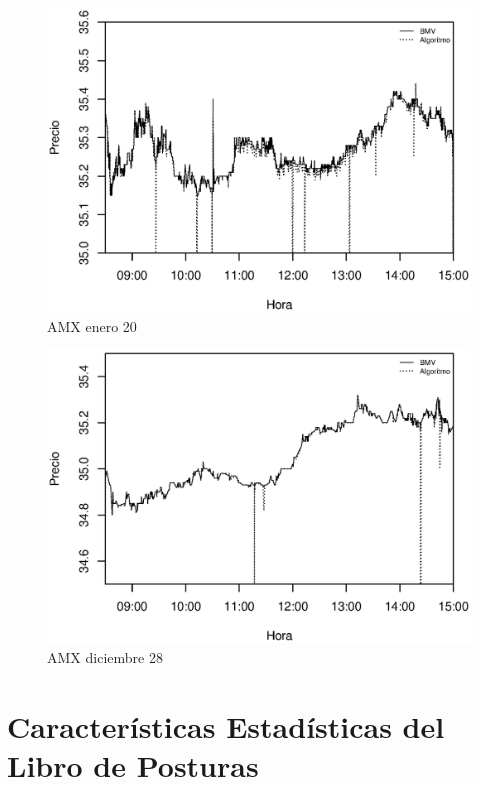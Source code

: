 \documentclass[10pt]{article}
\begin{document}
\begin{figure}[htbp] \centering
\includegraphics[scale=0.75, trim=0 0 0 2cm]{amx012011.eps}
\caption{AMX enero 20}
\label{amx0120}
\end{figure}

\begin{figure}[htbp] \centering
\includegraphics[scale=0.75, trim=0 0 0 2cm]{amx122810.eps}
\caption{AMX diciembre 28}
\label{amx1228}
\end{figure}

\clearpage

\section{Características Estadísticas del Libro de Posturas}
\end{document}
